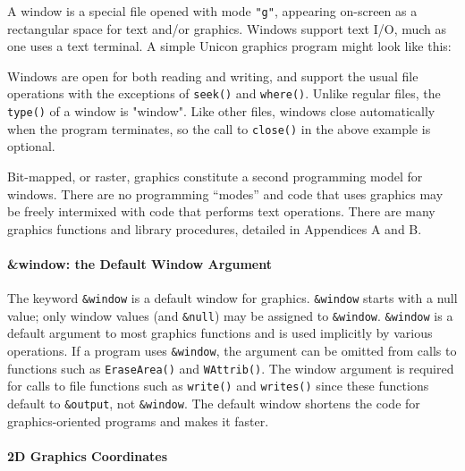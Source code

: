 A window is a special file opened with mode \texttt{"g"}, appearing
on-screen as a rectangular space for text and/or graphics. Windows
support text I/O, much as one uses a text terminal. A simple Unicon
graphics program might look like this:


Windows are open for both reading and writing, and support the usual
file operations with the exceptions of \texttt{seek()} and
\texttt{where()}. Unlike regular files, the \texttt{type()} of a
window is "window". Like other files, windows close automatically when
the program terminates, so the call to \texttt{close()} in the above
example is optional.

Bit-mapped, or raster, graphics constitute a second programming model
for windows. There are no programming ``modes'' and code that uses
graphics may be freely intermixed with code that performs text
operations. There are many graphics functions and library procedures,
detailed in Appendices A and B.

\paragraph{\&window: the Default Window Argument}

The keyword \texttt{\&window} is a default window for graphics.
\texttt{\&window} starts with a null value; only window values (and
\texttt{\&null}) may be assigned to
\texttt{\&window}. \texttt{\&window} is a default argument to most
graphics functions and is used implicitly by various operations. If a
program uses \texttt{\&window}, the argument can be omitted from calls
to functions such as \texttt{EraseArea()} and \texttt{WAttrib()}. The
window argument is required for calls to file functions such as
\texttt{write()} and \texttt{writes()} since these functions default
to \texttt{\&output}, not \texttt{\&window}. The default window
shortens the code for graphics-oriented programs and makes it faster.

\paragraph{2D Graphics Coordinates}

